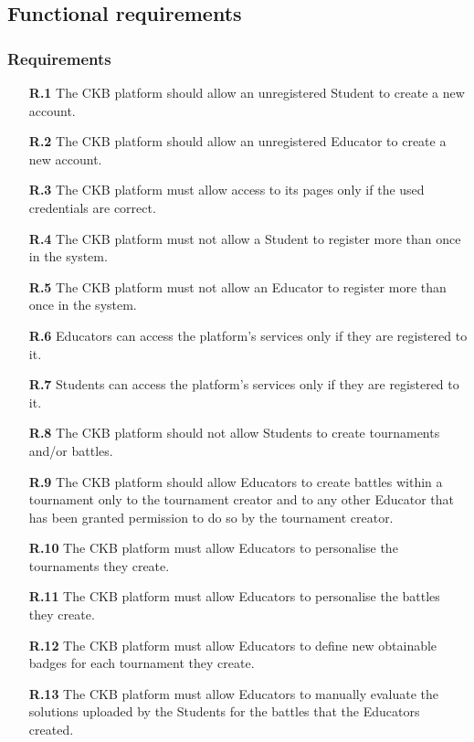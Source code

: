 \documentclass{article}
\begin{document}
{\newpage
\subsection{Functional requirements}
\subsubsection{Requirements}
\begin{itemize}

    \item[\textbf{R.1}] The CKB platform should allow an unregistered Student to create a new account.
    \item[\textbf{R.2}] The CKB platform should allow an unregistered Educator to create a new account.
    \item[\textbf{R.3}] The CKB platform must allow access to its pages only if the used credentials are correct.
    \item[\textbf{R.4}] The CKB platform must not allow a Student to register more than once in the system.
    \item[\textbf{R.5}] The CKB platform must not allow an Educator to register more than once in the system.
    \item[\textbf{R.6}] Educators can access the platform's services only if they are registered to it.
    \item[\textbf{R.7}] Students can access the platform's services only if they are registered to it.
    \item[\textbf{R.8}] The CKB platform should not allow Students to create tournaments and/or battles.
    \item[\textbf{R.9}] The CKB platform should allow Educators to create battles within a tournament only to the tournament
          creator and to any other Educator that has been granted permission to do so by the tournament creator.
    \item[\textbf{R.10}] The CKB platform must allow Educators to personalise the tournaments they create.
    \item[\textbf{R.11}] The CKB platform must allow Educators to personalise the battles they create.
    \item[\textbf{R.12}] The CKB platform must allow Educators to define new obtainable badges for each tournament they
          create.
    \item[\textbf{R.13}] The CKB platform must allow Educators to manually evaluate the solutions uploaded by the Students for the battles that
          the Educators created.

\end{itemize}}
\end{document}
